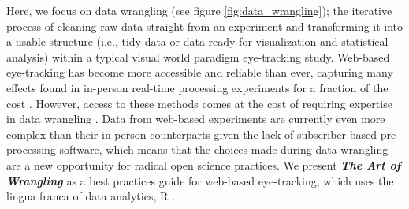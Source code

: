 Here, we focus on data wrangling (see figure \ref{fig:data_wrangling}); the iterative process of cleaning raw data straight from an experiment and transforming it into a usable structure (i.e., tidy data or data ready for visualization and statistical analysis) within a typical visual world paradigm eye-tracking study. Web-based eye-tracking has become more accessible and reliable than ever, capturing many effects found in in-person real-time processing experiments for a fraction of the cost \parencite[e.g.,][]{Vos_2017,Semmelmann_2017,Prystauka_Altmann_Rothman_2023,Degen_Seeing_2021}. However, access to these methods comes at the cost of requiring expertise in data wrangling \parencite[e.g., ][]{Vos_2017,Prystauka_Altmann_Rothman_2023}. Data from web-based experiments are currently even more complex than their in-person counterparts given the lack of subscriber-based pre-processing software, which means that the choices made during data wrangling are a new opportunity for radical open science practices. We present \textit{\textbf{The Art of Wrangling}} as a best practices guide for web-based eye-tracking, which uses the lingua franca of data analytics, R \parencite{mizumoto_r_2015, R}. 
